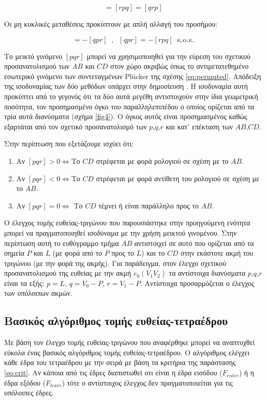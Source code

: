 \begin{equation}
[p q r] = [r p q] = [q r p]
 \label{eq:circular}
\end{equation}

Οι μη κυκλικές μεταθέσεις προκύπτουν με απλή αλλαγή του προσήμου:

\begin{equation}
[p q r] = -[q p r]\;\;,\;\;[q p r] = -[r p q] \;\;\text{κ.ο.κ.}
\label{eq:noncircular}
\end{equation}

Το μεικτό γινόμενο $[p q r]$ μπορεί να χρησιμοποιηθεί για την εύρεση του σχετικού προσανατολισμού των $AB$ και $CD$ στον χώρο ακριβώς όπως το αντιμετατεθημένο εσωτερικό γινόμενο των συντεταγμένων Plücker της σχέσης \eqref{eq:permuted}. Απόδειξη της ισοδυναμίας των δύο μεθόδων υπάρχει στην δημοσίευση \cite{kensler:06:triangle}. Η ισοδυναμία αυτή προκύπτει από το γεγονός ότι τα δύο αυτά μεγέθη αντιστοιχούν στην ίδια γεωμετρική ποσότητα, τον προσημασμένο όγκο του παραλληλεπιπέδου ο οποίος ορίζεται από τα τρία αυτά διανύσματα (σχήμα \ref{fig4}). Ο όγκος αυτός είναι προσημασμένος καθώς εξαρτάται από τον σχετικό προσανατολισμό των $p$,$q$,$r$ και κατ' επέκταση των $AB$,$CD$.

Στην περίπτωση που εξετάζουμε ισχύει ότι:

\begin{enumerate}
\item
 Αν $[p q r] > 0\iff$Το $CD$ στρέφεται με φορά ρολογιού σε σχέση με το $AB$.
\item
Αν $[p q r] < 0\iff$Το $CD$ στρέφεται με φορά αντίθετη του ρολογιού σε σχέση με το $AB$.
\item
Αν $[p q r] = 0\iff$ Το $CD$ τέμνει ή είναι παράλληλο προς το $AB$.\\
\end{enumerate}
Ο έλεγχος τομής ευθείας-τριγώνου που παρουσιάστηκε στην προηγούμενη ενότητα μπορεί να πραγματοποιηθεί ισοδύναμα με την χρήση μεικτού γινομένου. Στην περίπτωση αυτή το ευθύγραμμο τμήμα $AB$ αντιστοιχεί σε αυτό που ορίζεται από τα σημεία $P$ και $L$ (με φορά από το $P$ προς το $L$) και το $CD$ στην εκάστοτε ακμή του τριγώνου (με την φορά της ακμής). Για παράδειγμα, στον έλεγχο σχετικού προσανατολισμού της ευθείας με την ακμή $e_0(V_1V_2)$  τα αντίστοιχα διανύσματα $p$,$q$,$r$ είναι τα εξής: $p=L$, $q=V_0-P$, $ r=V_1-P$. Αντίστοιχα προσαρμόζεται ο έλεγχος των υπόλοιπων ακμών.

\subsection{Βασικός αλγόριθμος τομής ευθείας-τετραέδρου}
\label{chapter:raytetraint}
\noindent  Με βάση τον έλεγχο τομής ευθείας-τριγώνου που αναφέρθηκε μπορεί να αναπτυχθεί εύκολα ένας βασικός αλγόριθμος τομής ευθείας-τετραέδρου. Ο αλγόριθμος ελέγχει κάθε έδρα του τετραέδρου με την σειρά με βάση τα κριτήρια της παράστασης \eqref{eq:crit}. Aν κάποια από τις έδρες διαπιστωθεί οτι είναι η έδρα εισόδου ($F_{enter}$) ή η έδρα εξόδου ($F_{leave}$) τότε ο αντίστοιχος έλεγχος δεν πραγματοποιείται για τις υπόλοιπες έδρες. 

